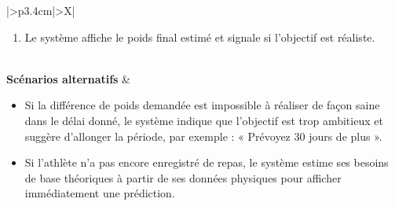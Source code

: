 ﻿\documentclass[a4paper,12pt]{report}
\begin{document}
\begin{table}[H]
\begin{tabularx}{\textwidth}{|>{\RaggedRight\arraybackslash}p{3.4cm}|>{\RaggedRight\arraybackslash}X|}
\begin{minipage}[t]{\linewidth}
\begin{enumerate}[label=\arabic*., leftmargin=*, topsep=0pt, itemsep=1pt]
    \item Le système affiche le poids final estimé et signale si l'objectif est réaliste.
\end{enumerate}
\vspace{2pt}
\end{minipage} \\
\hline
\textbf{Scénarios alternatifs} &
\begin{minipage}[t]{\linewidth}
\vspace{2pt}
\begin{itemize}[leftmargin=*, topsep=0pt, itemsep=1pt]
    \item Si la différence de poids demandée est impossible à réaliser de façon saine dans le délai donné, le système indique que l'objectif est trop ambitieux et suggère d'allonger la période, par exemple : « Prévoyez 30 jours de plus ».
    \item Si l'athlète n'a pas encore enregistré de repas, le système estime ses besoins de base théoriques à partir de ses données physiques pour afficher immédiatement une prédiction.
\end{itemize}
\vspace{2pt}
\end{minipage} \\
\hline
\end{tabularx}
\fussy
\end{table}
\end{document}
